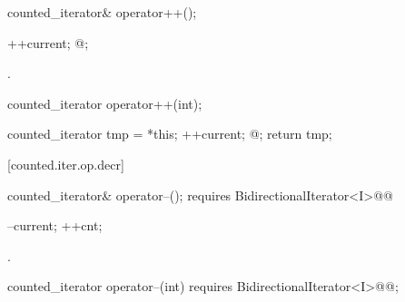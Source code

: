 \begin{addedblock}
%
%
\begin{itemdecl}
counted_iterator& operator++();
\end{itemdecl}

\begin{itemdescr}
\pnum
\requires {}

\pnum
\effects
\begin{codeblock}
++current;
@\dcr@cnt;
\end{codeblock}

\pnum
\returns {}.
\end{itemdescr}

%
%
\begin{itemdecl}
counted_iterator operator++(int);
\end{itemdecl}

\begin{itemdescr}
\pnum
\requires {}

\pnum
\effects
\begin{codeblock}
counted_iterator tmp = *this;
++current;
@\dcr@cnt;
return tmp;
\end{codeblock}
\end{itemdescr}

[counted.iter.op.decr]{}

%
%
\begin{itemdecl}
  counted_iterator& operator--();
    requires BidirectionalIterator<I>@\newtxt{()}@
\end{itemdecl}

\begin{itemdescr}
\pnum
\effects
\begin{codeblock}
--current;
++cnt;
\end{codeblock}

\pnum
\returns {}.
\end{itemdescr}

%
%
\begin{itemdecl}
  counted_iterator operator--(int)
    requires BidirectionalIterator<I>@\newtxt{()}@;
\end{itemdecl}


\end{addedblock}

